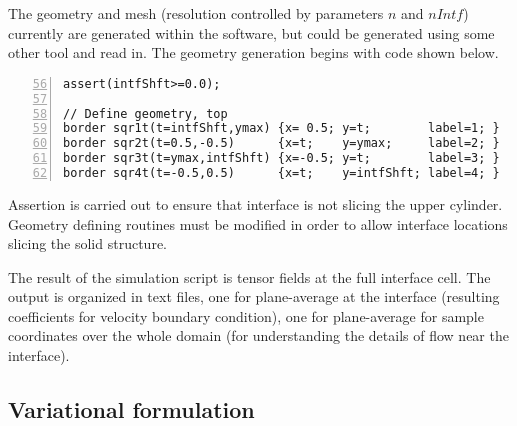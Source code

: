 \documentclass[12pt,a4paper]{article}
\begin{document}
The geometry and mesh (resolution controlled by parameters $n$ and $nIntf$) currently are generated within the software, but could be generated using some other tool and read in. The geometry generation begins with code shown below.
\begin{lstlisting}[numbers=left,firstnumber=56]
assert(intfShft>=0.0);

// Define geometry, top
border sqr1t(t=intfShft,ymax) {x= 0.5; y=t;        label=1; }
border sqr2t(t=0.5,-0.5)      {x=t;    y=ymax;     label=2; }
border sqr3t(t=ymax,intfShft) {x=-0.5; y=t;        label=3; }
border sqr4t(t=-0.5,0.5)      {x=t;    y=intfShft; label=4; }
\end{lstlisting}

Assertion is carried out to ensure that interface is not slicing the upper cylinder. Geometry defining routines must be modified in order to allow interface locations slicing the solid structure.

The result of the simulation script is tensor fields at the full interface cell. The output is organized in text files, one for plane-average at the interface (resulting coefficients for velocity boundary condition), one for plane-average for sample coordinates over the whole domain (for understanding the details of flow near the interface).

\subsection{Variational formulation}
\end{document}
